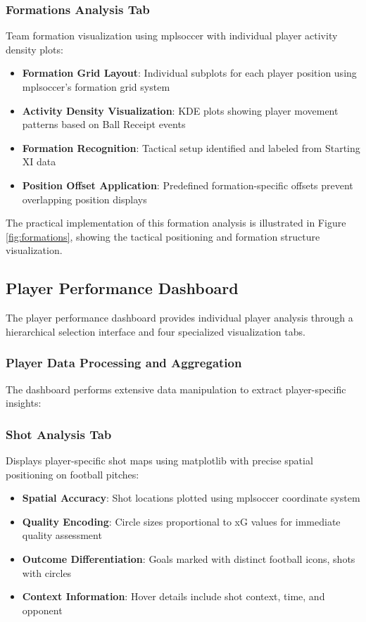 \documentclass[12pt,a4paper]{article}
\begin{document}
\subsubsection{Formations Analysis Tab}
\label{sec:formations_analysis}
Team formation visualization using mplsoccer with individual player activity density plots:
\begin{itemize}
    \item \textbf{Formation Grid Layout}: Individual subplots for each player position using mplsoccer's formation grid system
    \item \textbf{Activity Density Visualization}: KDE plots showing player movement patterns based on Ball Receipt events
    \item \textbf{Formation Recognition}: Tactical setup identified and labeled from Starting XI data
    \item \textbf{Position Offset Application}: Predefined formation-specific offsets prevent overlapping position displays
\end{itemize}

The practical implementation of this formation analysis is illustrated in Figure \ref{fig:formations}, showing the tactical positioning and formation structure visualization.


\subsection{Player Performance Dashboard}
\label{sec:player_performance}

The player performance dashboard provides individual player analysis through a hierarchical selection interface and four specialized visualization tabs.


\subsubsection{Player Data Processing and Aggregation}
The dashboard performs extensive data manipulation to extract player-specific insights:

\subsubsection{Shot Analysis Tab}
Displays player-specific shot maps using matplotlib with precise spatial positioning on football pitches:
\begin{itemize}
    \item \textbf{Spatial Accuracy}: Shot locations plotted using mplsoccer coordinate system
    \item \textbf{Quality Encoding}: Circle sizes proportional to xG values for immediate quality assessment
    \item \textbf{Outcome Differentiation}: Goals marked with distinct football icons, shots with circles
    \item \textbf{Context Information}: Hover details include shot context, time, and opponent
\end{itemize}
\end{document}
